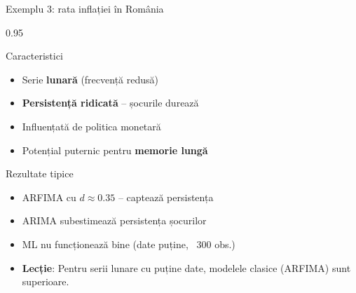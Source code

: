 \documentclass[9pt, aspectratio=169, t]{beamer}
\begin{document}
\begin{frame}{Exemplu 3: rata inflației în România}
    \begin{cminipage}{0.95\textwidth}
        \begin{block}{Caracteristici}
            \begin{itemize}\setlength{\itemsep}{0pt}
                \item Serie \textbf{lunară} (frecvență redusă)
                \item \textbf{Persistență ridicată} -- șocurile durează
                \item Influențată de politica monetară
                \item Potențial puternic pentru \textbf{memorie lungă}
            \end{itemize}
        \end{block}

        \vspace{0.1cm}

        \begin{alertblock}{Rezultate tipice}
            \begin{itemize}\setlength{\itemsep}{0pt}
                \item ARFIMA cu $d \approx 0.35$ -- captează persistența
                \item ARIMA subestimează persistența șocurilor
                \item ML nu funcționează bine (date puține, ~300 obs.)
            \end{itemize}
        \end{alertblock}

        \vspace{0.2cm}

        {\footnotesize
        \begin{exampleblock}{}
            \begin{itemize}\setlength{\itemsep}{0pt}
                \item \textbf{Lecție}: Pentru serii lunare cu puține date, modelele clasice (ARFIMA) sunt superioare.
            \end{itemize}
        \end{exampleblock}
        }
    \end{cminipage}
\end{frame}
\end{document}
